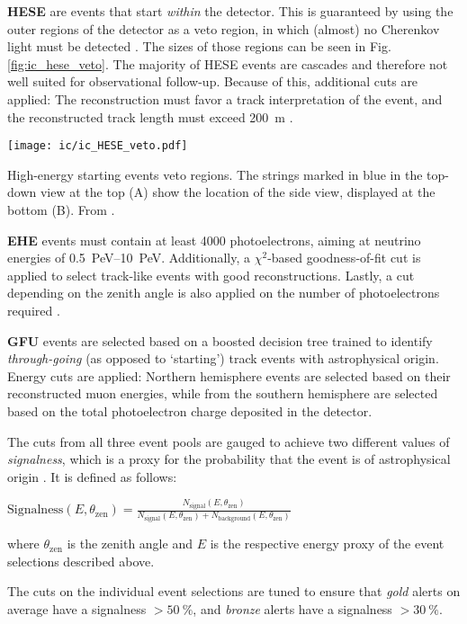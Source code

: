\textbf{HESE} are events that start \textit{within} the detector. This is guaranteed by using the outer regions of the detector as a veto region, in which (almost) no Cherenkov light must be detected . The sizes of those regions can be seen in Fig. \ref{fig:ic_hese_veto}. The majority of HESE events are cascades and therefore not well suited for observational follow-up. Because of this, additional cuts are applied: The reconstruction must favor a track interpretation of the event, and the reconstructed track length must exceed \SI{200}{\meter} \cite{Tung2019}.
\begin{marginfigure}
    \texttt{[image: ic/ic\_HESE\_veto.pdf]}
    \caption[HESE veto regions]{High-energy starting events veto regions. The strings marked in blue in the top-down view at the top (A) show the location of the side view, displayed at the bottom (B). From \cite{Aartsen2013}.}
\end{marginfigure}

\textbf{EHE} events must contain at least 4000 photoelectrons, aiming at neutrino energies of \SIrange{0.5}{10}{\peta\eV}. Additionally, a $\chi^2$-based goodness-of-fit cut is applied to select track-like events with good reconstructions. Lastly, a cut depending on the zenith angle is also applied on the number of photoelectrons required \cite{Tung2019}.

\textbf{GFU} events are selected based on a boosted decision tree trained to identify \textit{through-going} (as opposed to `starting') track events with astrophysical origin. Energy cuts are applied: Northern hemisphere events are selected based on their reconstructed muon energies, while from the southern hemisphere are selected based on the total photoelectron charge deposited in the detector.

The cuts from all three event pools are gauged to achieve two different values of \textit{signalness}, which is a proxy for the probability that the event is of astrophysical origin \cite{Tung2019}. It is defined as follows:
\begin{definition}\label{signalness_def}
$\text{Signalness}(E,\theta_\text{zen}) = \frac{N_\text{signal}(E,\theta_\text{zen})}{N_\text{signal}(E,\theta_\text{zen})+N_\text{background}(E,\theta_\text{zen})}$
\end{definition}
where $\theta_\text{zen}$ is the zenith angle and $E$ is the respective energy proxy of the event selections described above.

The cuts on the individual event selections are tuned to ensure that \textit{gold} alerts on average have a signalness $>\SI{50}{\percent}$, and \textit{bronze} alerts have a signalness $>\SI{30}{\percent}$.
